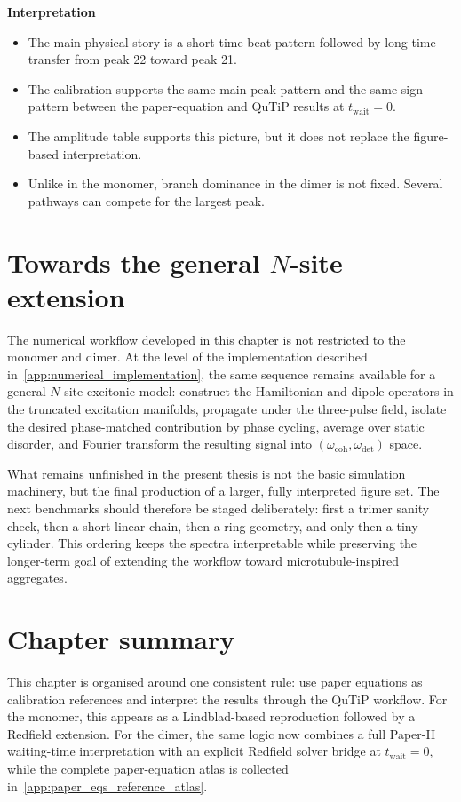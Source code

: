 \textbf{Interpretation}
\begin{itemize}
    \item The main physical story is a short-time beat pattern followed by long-time transfer from peak 22 toward peak 21.
    \item The calibration supports the same main peak pattern and the same sign pattern between the paper-equation and QuTiP results at $t_{\mathrm{wait}}=0$.
    \item The amplitude table supports this picture, but it does not replace the figure-based interpretation.
    \item Unlike in the monomer, branch dominance in the dimer is not fixed. Several pathways can compete for the largest peak.
\end{itemize}

\section{Towards the general \texorpdfstring{$N$}{N}-site extension}
\label{sec:results_nsite_extension}

The numerical workflow developed in this chapter is not restricted to the monomer and dimer. At the level of the implementation described in~\autoref{app:numerical_implementation}, the same sequence remains available for a general $N$-site excitonic model: construct the Hamiltonian and dipole operators in the truncated excitation manifolds, propagate under the three-pulse field, isolate the desired phase-matched contribution by phase cycling, average over static disorder, and Fourier transform the resulting signal into $(\omega_{\mathrm{coh}},\omega_{\mathrm{det}})$ space.

What remains unfinished in the present thesis is not the basic simulation machinery, but the final production of a larger, fully interpreted figure set. The next benchmarks should therefore be staged deliberately: first a trimer sanity check, then a short linear chain, then a ring geometry, and only then a tiny cylinder. This ordering keeps the spectra interpretable while preserving the longer-term goal of extending the workflow toward microtubule-inspired aggregates.

\section{Chapter summary}
\label{sec:results_summary}

This chapter is organised around one consistent rule: use paper equations as calibration references and interpret the results through the QuTiP workflow. For the monomer, this appears as a Lindblad-based reproduction followed by a Redfield extension. For the dimer, the same logic now combines a full Paper-II waiting-time interpretation with an explicit Redfield solver bridge at $t_{\mathrm{wait}}=0$, while the complete paper-equation atlas is collected in~\autoref{app:paper_eqs_reference_atlas}.
